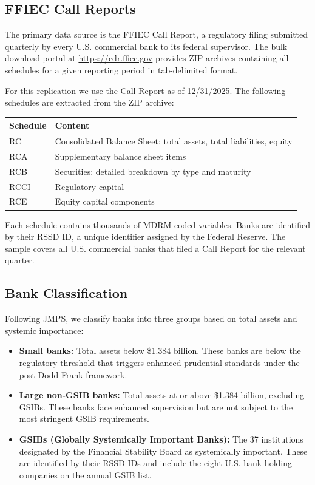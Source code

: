 \documentclass[12pt, a4paper]{article}
\begin{document}
\subsection{FFIEC Call Reports}

The primary data source is the FFIEC Call Report, a regulatory filing submitted
quarterly by every U.S. commercial bank to its federal supervisor. The bulk download
portal at \url{https://cdr.ffiec.gov} provides ZIP archives containing all schedules
for a given reporting period in tab-delimited format.

For this replication we use the Call Report as of 12/31/2025.
The following schedules are extracted from the ZIP archive:

\begin{center}
\begin{tabular}{lp{9cm}}
\toprule
Schedule & Content \\
\midrule
RC   & Consolidated Balance Sheet: total assets, total liabilities, equity \\
RCA  & Supplementary balance sheet items \\
RCB  & Securities: detailed breakdown by type and maturity \\
RCCI & Regulatory capital \\
RCE  & Equity capital components \\
\bottomrule
\end{tabular}
\end{center}

Each schedule contains thousands of MDRM-coded variables. Banks are identified
by their RSSD ID, a unique identifier assigned by the Federal Reserve. The
sample covers all U.S. commercial banks that filed a Call Report for the relevant
quarter.

\subsection{Bank Classification}

Following JMPS, we classify banks into three groups based on total assets and
systemic importance:

\begin{itemize}
    \item \textbf{Small banks:} Total assets below \$1.384 billion. These banks
    are below the regulatory threshold that triggers enhanced prudential standards
    under the post-Dodd-Frank framework.
    \item \textbf{Large non-GSIB banks:} Total assets at or above \$1.384 billion,
    excluding GSIBs. These banks face enhanced supervision but are not subject to
    the most stringent GSIB requirements.
    \item \textbf{GSIBs (Globally Systemically Important Banks):} The 37 institutions
    designated by the Financial Stability Board as systemically important. These are
    identified by their RSSD IDs and include the eight U.S. bank holding companies
    on the annual GSIB list.
\end{itemize}
\end{document}
